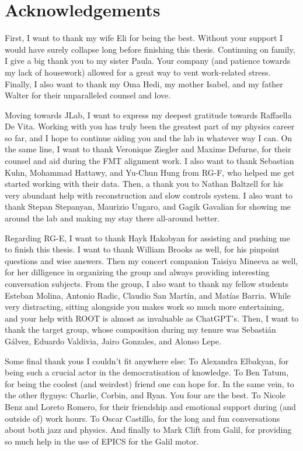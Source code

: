 \section*{Acknowledgements}
    First, I want to thank my wife Eli for being the best.
    Without your support I would have surely collapse long before finishing this thesis.
    Continuing on family, I give a big thank you to my sister Paula.
    Your company (and patience towards my lack of housework) allowed for a great way to vent work-related stress.
    Finally, I also want to thank my Oma Hedi, my mother Isabel, and my father Walter for their unparalleled counsel and love.

    Moving towards JLab, I want to express my deepest gratitude towards Raffaella De Vita.
    Working with you has truly been the greatest part of my physics career so far, and I hope to continue aiding you and the lab in whatever way I can.
    On the same line, I want to thank Veronique Ziegler and Maxime Defurne, for their counsel and aid during the FMT alignment work.
    I also want to thank Sebastian Kuhn, Mohammad Hattawy, and Yu-Chun Hung from RG-F, who helped me get started working with their data.
    Then, a thank you to Nathan Baltzell for his very abundant help with reconstruction and slow controls system.
    I also want to thank Stepan Stepanyan, Maurizio Ungaro, and Gagik Gavalian for showing me around the lab and making my stay there all-around better.

    Regarding RG-E, I want to thank Hayk Hakobyan for assisting and pushing me to finish this thesis.
    I want to thank William Brooks as well, for his pinpoint questions and wise answers.
    Then my concert companion Taisiya Mineeva as well, for her dilligence in organizing the group and always providing interesting conversation subjects.
    From the group, I also want to thank my fellow students Esteban Molina, Antonio Radic, Claudio San Martín, and Matías Barria.
    While very distracting, sitting alongside you makes work so much more entertaining, and your help with ROOT is almost as invaluable as ChatGPT's.
    Then, I want to thank the target group, whose composition during my tenure was Sebastián Gálvez, Eduardo Valdivia, Jairo Gonzales, and Alonso Lepe.

    Some final thank yous I couldn't fit anywhere else:
    To Alexandra Elbakyan, for being such a crucial actor in the democratisation of knowledge.
    To Ben Tatum, for being the coolest (and weirdest) friend one can hope for.
    In the same vein, to the other flyguys: Charlie, Corbin, and Ryan.
    You four are the best.
    To Nicole Benz and Loreto Romero, for their friendship and emotional support during (and outside of) work hours.
    To Oscar Castillo, for the long and fun conversations about both jazz and physics.
    And finally to Mark Clift from Galil, for providing so much help in the use of EPICS for the Galil motor.

